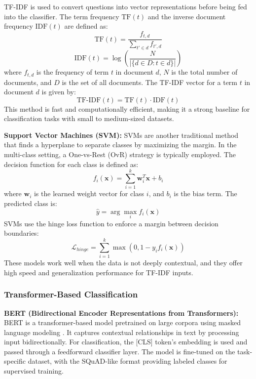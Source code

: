 \documentclass[conference]{IEEEtran}
\begin{document}
TF-IDF is used to convert questions into vector representations before being fed into the classifier.
The term frequency $\text{TF}(t)$  and the inverse document frequency $\text{IDF}(t)$ are defined as:
\begin{equation}
    \text{TF}(t) = \frac{f_{t,d}}{\sum_{t' \in d} f_{t',d}}
\end{equation}
\begin{equation}
    \text{IDF}(t) = \log\left(\frac{N}{|\{d \in D: t \in d\}|}\right)
\end{equation}
where $f_{t,d}$ is the frequency of term $t$ in document $d$, $N$ is the total number of documents, and $D$ is the set of all documents.
The TF-IDF vector for a term $t$ in document $d$ is given by:
\begin{equation}
    \text{TF-IDF}(t) = \text{TF}(t) \cdot \text{IDF}(t)
\end{equation}
This method is fast and computationally efficient, making it a strong baseline for classification tasks with small to medium-sized datasets.

\textbf{Support Vector Machines (SVM):}
SVMs are another traditional method that finds a hyperplane to separate classes by maximizing the margin. 
In the multi-class setting, a One-vs-Rest (OvR) strategy is typically employed. 
The decision function for each class is defined as:
\begin{equation}
    f_i(\mathbf{x}) = \sum_{i=1}^{k} \mathbf{w}^T_i \mathbf{x} + b_i
\end{equation}
where $\mathbf{w}_i$ is the learned weight vector for class $i$, and $b_i$ is the bias term.
The predicted class is:
\begin{equation}
    \hat{y} = \arg\max_{i} f_i(\mathbf{x})
\end{equation}
SVMs use the hinge loss function to enforce a margin between decision boundaries:
\begin{equation}
    \mathcal{L}_{hinge} = \sum_{i=1}^{k} \max(0, 1 - y_i f_i(\mathbf{x}))
\end{equation}
These models work well when the data is not deeply contextual, and they offer high speed and generalization performance for TF-IDF inputs.

\subsubsection{Transformer-Based Classification}
\textbf{BERT (Bidirectional Encoder Representations from Transformers):}
BERT is a transformer-based model pretrained on large corpora using masked language modeling \cite{b12}. 
It captures contextual relationships in text by processing input bidirectionally. 
For classification, the [CLS] token's embedding is used and passed through a feedforward classifier layer. 
The model is fine-tuned on the task-specific dataset, with the SQuAD-like format providing labeled classes for supervised training.
\end{document}

